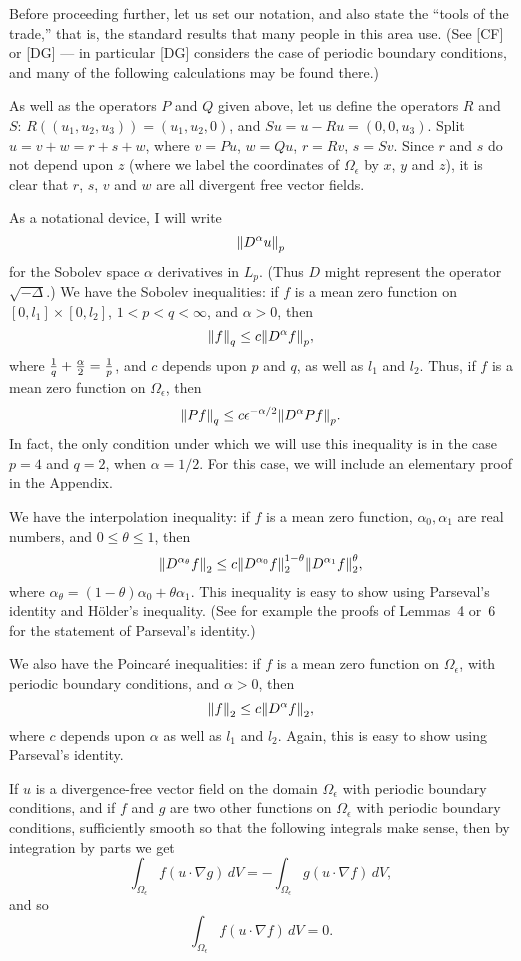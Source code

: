 Before proceeding further, let us set our notation, and also 
state the ``tools of the trade,'' that is, the standard results
that many people in this area use.  
(See [CF] or [DG] --- in particular [DG] considers the case of
periodic boundary conditions, and many of the following
calculations may be found there.)

As well as the operators $P$ and $Q$ given
above, let us define the operators $R$ and $S$:
$R((u_1,u_2,u_3)) = (u_1,u_2,0)$, and $Su = u - Ru = (0,0,u_3)$.
Split $u = v + w = r + s + w$, where $v = Pu$, $w = Qu$, $r = Rv$, 
$s = Sv$.  Since
$r$ and $s$ do not depend upon $z$ (where we label the coordinates
of $\Omega_\epsilon$ by $x$, $y$ and $z$), it is clear that
$r$, $s$, $v$ and $w$ are all divergent free vector fields.

As a notational device, I will write
$$ {\mathopen\|D^\alpha u\mathclose\|}_p $$
for the Sobolev space $\alpha$ derivatives in $L_p$.  (Thus $D$ might
represent the operator $\sqrt{-\Delta}$.)
We have the Sobolev inequalities: if
$f$ is a mean zero
function on $[0,l_1]\times [0,l_2]$, $1 < p < q < \infty$, and
$\alpha > 0$, then
$$ {\mathopen\|f\mathclose\|}_q \le c {\mathopen\|D^\alpha f\mathclose\|}_p ,$$
where ${1\over q} + {\alpha \over 2} = {1\over p}$, and
$c$ depends upon $p$ and $q$, as well as $l_1$ and $l_2$.  Thus, if
$f$ is a mean zero function on $\Omega_\epsilon$, then
$$ {\mathopen\|Pf\mathclose\|}_q \le c \epsilon^{-\alpha/2} {\mathopen\|D^\alpha Pf\mathclose\|}_p .$$
In fact, the only condition under which we will use this inequality is
in the case $p=4$ and $q=2$, when $\alpha = 1/2$.  For this case,
we will include an elementary proof in the Appendix.

We have the interpolation inequality: if $f$ is a mean zero
function,
$\alpha_0,\alpha_1$ are real numbers, and $0 \le \theta \le 1$, then
$$ {\mathopen\|D^{\alpha_\theta} f\mathclose\|}_2 \le c
   {\mathopen\|D^{\alpha_0} f\mathclose\|}_2^{1-\theta}
   {\mathopen\|D^{\alpha_1} f\mathclose\|}_2^\theta ,$$
where $\alpha_\theta = (1-\theta)\alpha_0 + \theta \alpha_1$.
This inequality is easy to
show using Parseval's identity and H\"older's inequality.
(See for example the proofs of Lemmas~4
or~6 for the statement of Parseval's identity.)

We also have the Poincar\'e inequalities: if $f$ is a mean zero function
on $\Omega_\epsilon$,
with periodic boundary conditions,
and $\alpha>0$, then
$$ {\mathopen\|f\mathclose\|}_2 \le c {\mathopen\|D^\alpha f\mathclose\|}_2 ,$$
where $c$ depends upon $\alpha$ as well as $l_1$ and $l_2$.
Again, 
this is easy to show using Parseval's identity.

If $u$ is a divergence-free vector field on the domain 
$\Omega_\epsilon$
with periodic boundary conditions, and if $f$ and $g$ are two other 
functions on $\Omega_\epsilon$ with periodic boundary conditions, 
sufficiently smooth so that the
following integrals make sense, then by integration by parts we get
$$ \int_{\Omega_\epsilon} f (u \cdot \nabla g) \, dV
   =
   - \int_{\Omega_\epsilon} g (u \cdot \nabla f) \, dV ,$$
and so
$$ \int_{\Omega_\epsilon} f (u \cdot \nabla f) \, dV = 0 .$$

